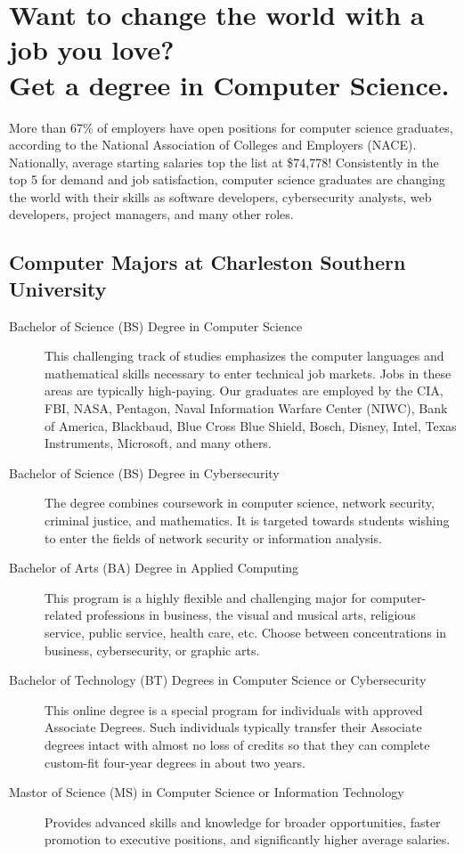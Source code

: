 %
\section*{Want to change the world with a job you love?\\
Get a degree in Computer Science.}
More than 67\% of employers have open positions for computer science graduates, according to the National Association of Colleges and Employers (NACE). Nationally, average starting salaries top the list at \$74,778! Consistently in the top 5 for demand and job satisfaction, computer science graduates are changing the world with their skills as software developers, cybersecurity analysts, web developers, project managers, and many other roles.

\subsection{Computer Majors at Charleston Southern University}
\begin{description}
	\item[Bachelor of Science (BS) Degree in Computer Science] This challenging track of studies emphasizes the computer languages and mathematical skills necessary to enter technical job markets. Jobs in these areas are typically high-paying. Our graduates are employed by the CIA, FBI, NASA, Pentagon, Naval Information Warfare Center (NIWC), Bank of America, Blackbaud, Blue Cross Blue Shield, Bosch, Disney, Intel, Texas Instruments, Microsoft, and many others.

	\item[Bachelor of Science (BS) Degree in Cybersecurity] The degree combines coursework in computer science, network security, criminal justice, and mathematics. It is targeted towards students wishing to enter the fields of network security or information analysis.

	\item[Bachelor of Arts (BA) Degree in Applied Computing] This program is a highly flexible and challenging major for computer-related professions in business, the visual and musical arts, religious service, public service, health care, etc. Choose between concentrations in business, cybersecurity, or graphic arts.

	\item[Bachelor of Technology (BT) Degrees in Computer Science or Cybersecurity] This online degree is a special program for individuals with approved Associate Degrees. Such individuals typically transfer their Associate degrees intact with almost no loss of credits so that they can complete custom-fit four-year degrees in about two years.

	\item[Mastor of Science (MS) in Computer Science or Information Technology] Provides advanced skills and knowledge for broader opportunities, faster promotion to executive positions, and significantly higher average salaries.%
\end{description}

